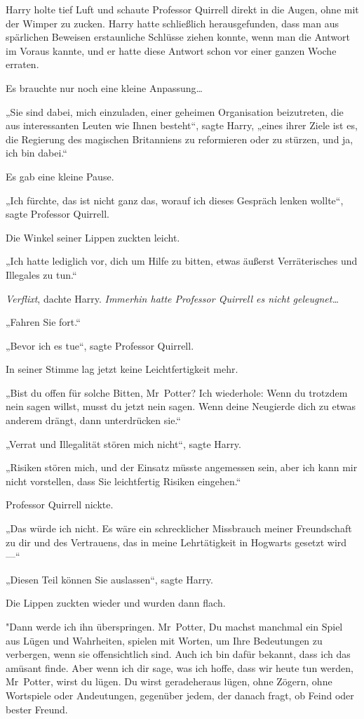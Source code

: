 {Harry holte tief Luft und schaute Professor Quirrell direkt in die Augen, ohne mit der Wimper zu zucken. Harry hatte schließlich herausgefunden, dass man aus spärlichen Beweisen erstaunliche Schlüsse ziehen konnte, wenn man die Antwort im Voraus kannte, und er hatte diese Antwort schon vor einer ganzen Woche erraten.

Es brauchte nur noch eine kleine Anpassung…

„Sie sind dabei, mich einzuladen, einer geheimen Organisation beizutreten, die aus interessanten Leuten wie Ihnen besteht“, sagte Harry, „eines ihrer Ziele ist es, die Regierung des magischen Britanniens zu reformieren oder zu stürzen, und ja, ich bin dabei.“

Es gab eine kleine Pause.

„Ich fürchte, das ist nicht ganz das, worauf ich dieses Gespräch lenken wollte“, sagte Professor Quirrell.

Die Winkel seiner Lippen zuckten leicht.

„Ich hatte lediglich vor, dich um Hilfe zu bitten, etwas äußerst Verräterisches und Illegales zu tun.“

\emph{Verflixt}, dachte Harry. \emph{Immerhin hatte Professor Quirrell es nicht geleugnet…}

„Fahren Sie fort.“

„Bevor ich es tue“, sagte Professor Quirrell.

In seiner Stimme lag jetzt keine Leichtfertigkeit mehr.

„Bist du offen für solche Bitten, Mr~Potter? Ich wiederhole: Wenn du trotzdem nein sagen willst, musst du jetzt nein sagen. Wenn deine Neugierde dich zu etwas anderem drängt, dann unterdrücken sie.“

„Verrat und Illegalität stören mich nicht“, sagte Harry.

„Risiken stören mich, und der Einsatz müsste angemessen sein, aber ich kann mir nicht vorstellen, dass Sie leichtfertig Risiken eingehen.“

Professor Quirrell nickte.

„Das würde ich nicht. Es wäre ein schrecklicher Missbrauch meiner Freundschaft zu dir und des Vertrauens, das in meine Lehrtätigkeit in Hogwarts gesetzt wird—“

„Diesen Teil können Sie auslassen“, sagte Harry.

Die Lippen zuckten wieder und wurden dann flach.

"Dann werde ich ihn überspringen. Mr~Potter, Du machst manchmal ein Spiel aus Lügen und Wahrheiten, spielen mit Worten, um Ihre Bedeutungen zu verbergen, wenn sie offensichtlich sind. Auch ich bin dafür bekannt, dass ich das amüsant finde. Aber wenn ich dir sage, was ich hoffe, dass wir heute tun werden, Mr~Potter, wirst du lügen. Du wirst geradeheraus lügen, ohne Zögern, ohne Wortspiele oder Andeutungen, gegenüber jedem, der danach fragt, ob Feind oder bester Freund.

}
